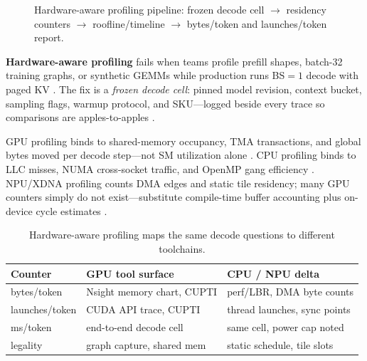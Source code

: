 
\begin{figure}[t]
\centering
{}
\caption{Hardware-aware profiling pipeline: frozen decode cell $\rightarrow$ residency counters $\rightarrow$ roofline/timeline $\rightarrow$ bytes/token and launches/token report.}
\label{fig:hw_aware_profiling_pipeline}
\end{figure}

\textbf{Hardware-aware profiling} fails when teams profile prefill shapes, batch-32 training graphs, or synthetic GEMMs while production runs BS${=}1$ decode with paged KV \citep{kwon2023vllm,patel2025llminference,taxbreak2026}. The fix is a \emph{frozen decode cell}: pinned model revision, context bucket, sampling flags, warmup protocol, and SKU---logged beside every trace so comparisons are apples-to-apples \citep{memoryfloor2026,chen2020compilerbasedhardw,yirage2026}.

GPU profiling binds to shared-memory occupancy, TMA transactions, and global bytes moved per decode step---not SM utilization alone \citep{nvidia2022hopper,semianalysis2024tma,patel2025llminference}. CPU profiling binds to LLC misses, NUMA cross-socket traffic, and OpenMP gang efficiency \citep{dlbook,chen2020compilerbasedhardw}. NPU/XDNA profiling counts DMA edges and static tile residency; many GPU counters simply do not exist---substitute compile-time buffer accounting plus on-device cycle estimates \citep{amd2024xdna,amd2024aie,yirage2026}.

\begin{table}[t]
\centering
\small
\begin{tabular}{@{}lll@{}}
\toprule
\textbf{Counter} & \textbf{GPU tool surface} & \textbf{CPU / NPU delta} \\
\midrule
bytes/token & Nsight memory chart, CUPTI & perf/LBR, DMA byte counts \\
launches/token & CUDA API trace, CUPTI & thread launches, sync points \\
ms/token & end-to-end decode cell & same cell, power cap noted \\
legality & graph capture, shared mem & static schedule, tile slots \\
\bottomrule
\end{tabular}
\caption{Hardware-aware profiling maps the same decode questions to different toolchains.}
\label{tab:ch22_profiling_counters}
\end{table}

